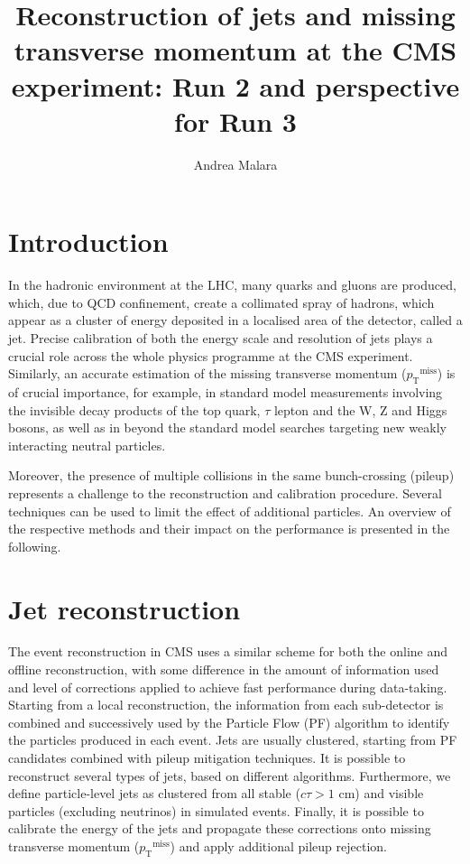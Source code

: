 \documentclass[a4paper,11pt]{article}
\title{Reconstruction of jets and missing transverse momentum at the CMS experiment: Run 2 and perspective for Run 3}
\author*[a]{Andrea Malara}
\affiliation[a]{Institut f{\"u}r Experimentalphysik, Universit\"at Hamburg, Luruper Chaussee 149, Hamburg, Germany }
\newcommand{\MET}{\ensuremath{\ptmiss}\xspace}
\newcommand{\pt}{\ensuremath{p_{\text{T}}}\xspace}
\newcommand{\ptmiss}{\ensuremath{\pt^\text{miss}}\xspace}
\begin{document}
\maketitle

\section{Introduction}

In the hadronic environment at the LHC, many quarks and gluons are produced, which, due to QCD confinement, create a collimated spray of hadrons, which appear as a cluster of energy deposited in a localised area of the detector, called a jet.
Precise calibration of both the energy scale and resolution of jets plays a crucial role across the whole physics programme at the CMS experiment. Similarly, an accurate estimation of the missing transverse momentum (\ptmiss) is of crucial importance, for example, in standard model measurements involving the invisible decay products of the top quark, $\tau$ lepton and the W, Z and Higgs bosons, as well as in beyond the standard model searches targeting new weakly interacting neutral particles.\par
Moreover, the presence of multiple collisions in the same bunch-crossing (pileup) represents a challenge to the reconstruction and calibration procedure. Several techniques can be used to limit the effect of additional particles. An overview of the respective methods and their impact on the performance is presented in the following.

\section{Jet reconstruction}
The event reconstruction in CMS \citep{Collaboration_2008} uses a similar scheme for both the online and offline reconstruction, with some difference in the amount of information used and level of corrections applied to achieve fast performance during data-taking. Starting from a local reconstruction, the information from each sub-detector is combined and successively used by the Particle Flow (PF) \citep{PF} algorithm to identify the particles produced in each event. Jets are usually clustered, starting from PF candidates combined with pileup mitigation techniques. It is possible to reconstruct several types of jets, based on different algorithms. Furthermore, we define particle-level jets as clustered from all stable ($c\tau >1$ cm) and visible particles (excluding neutrinos) in simulated events. Finally, it is possible to calibrate the energy of the jets and propagate these corrections onto missing transverse momentum (\MET) and apply additional pileup rejection.
\end{document}
